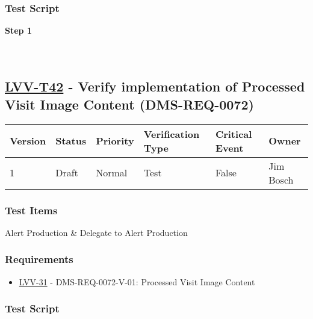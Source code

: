 \hypertarget{test-script-18}{%
\subsubsection{Test Script}\label{test-script-18}}

\textbf{Step 1}\\
~\\
~\\

\hypertarget{lvv-t42---verify-implementation-of-processed-visit-image-content-dms-req-0072}{%
\subsection{\texorpdfstring{\href{https://jira.lsstcorp.org/secure/Tests.jspa\#/testCase/LVV-T42}{LVV-T42}
- Verify implementation of Processed Visit Image Content
(DMS-REQ-0072)}{LVV-T42 - Verify implementation of Processed Visit Image Content (DMS-REQ-0072)}}\label{lvv-t42---verify-implementation-of-processed-visit-image-content-dms-req-0072}}

\begin{longtable}[]{@{}llllll@{}}
\toprule
Version & Status & Priority & Verification Type & Critical Event &
Owner\tabularnewline
\midrule
\endhead
1 & Draft & Normal & Test & False & Jim Bosch\tabularnewline
\bottomrule
\end{longtable}

\hypertarget{test-items-18}{%
\subsubsection{Test Items}\label{test-items-18}}

Alert Production \& Delegate to Alert Production

\hypertarget{requirements-19}{%
\subsubsection{Requirements}\label{requirements-19}}

\begin{itemize}
\tightlist
\item
  \href{https://jira.lsstcorp.org/browse/LVV-31}{LVV-31} -
  DMS-REQ-0072-V-01: Processed Visit Image Content
\end{itemize}

\hypertarget{test-script-19}{%
\subsubsection{Test Script}\label{test-script-19}}

